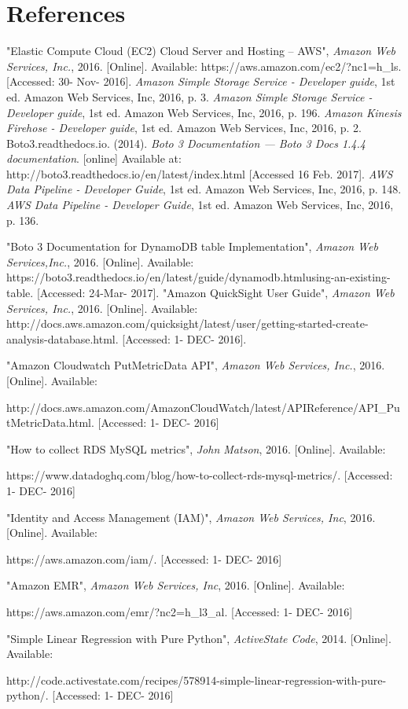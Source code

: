 \section{References}
\begin{thebibliography}{10}
   	"Elastic Compute Cloud (EC2) Cloud Server and Hosting – AWS", \textit{Amazon Web Services, Inc.}, 2016. [Online]. Available: https://aws.amazon.com/ec2/?nc1=h\_ls. [Accessed: 30- Nov- 2016].
    \textit{Amazon Simple Storage Service - Developer guide}, 1st ed. Amazon Web Services, Inc, 2016, p. 3.
  	\textit{Amazon Simple Storage Service - Developer guide}, 1st ed. Amazon Web Services, Inc, 2016, p. 196.
    \textit{Amazon Kinesis Firehose - Developer guide}, 1st ed. Amazon Web Services, Inc, 2016, p. 2.
  	 Boto3.readthedocs.io. (2014). \textit{Boto 3 Documentation — Boto 3 Docs 1.4.4 documentation}. [online] Available at: http://boto3.readthedocs.io/en/latest/index.html [Accessed 16 Feb. 2017].
  	\textit{AWS Data Pipeline - Developer Guide}, 1st ed. Amazon Web Services, Inc, 2016, p. 148.
  	\textit{AWS Data Pipeline - Developer Guide}, 1st ed. Amazon Web Services, Inc, 2016, p. 136.
  
  	"Boto 3 Documentation for DynamoDB table Implementation", \textit{Amazon Web Services,Inc.}, 2016. [Online]. Available: 	   
https://boto3.readthedocs.io/en/latest/guide/dynamodb.htmlusing-an-existing-table. [Accessed: 24-Mar- 2017].
"Amazon QuickSight User Guide", \textit{Amazon Web Services, Inc.}, 2016. [Online]. Available:
 http://docs.aws.amazon.com/quicksight/latest/user/getting-started-create-analysis-database.html. [Accessed: 1- DEC- 2016].
  
	"Amazon Cloudwatch PutMetricData API", \textit{Amazon Web Services, Inc.}, 2016. [Online]. Available:
    
http://docs.aws.amazon.com/AmazonCloudWatch/latest/APIReference/API\_PutMetricData.html. [Accessed: 1- DEC- 2016]

	"How to collect RDS MySQL metrics", \textit{John Matson}, 2016. [Online]. Available:
    
https://www.datadoghq.com/blog/how-to-collect-rds-mysql-metrics/. [Accessed: 1- DEC- 2016]
    
    "Identity and Access Management (IAM)", \textit{Amazon Web Services, Inc}, 2016. [Online]. Available:
    
https://aws.amazon.com/iam/. [Accessed: 1- DEC- 2016]
  
 	"Amazon EMR", \textit{Amazon Web Services, Inc}, 2016. [Online]. Available:
    
https://aws.amazon.com/emr/?nc2=h\_l3\_al. [Accessed: 1- DEC- 2016]

	"Simple Linear Regression with Pure Python", \textit{ActiveState Code}, 2014. [Online]. Available:
    
http://code.activestate.com/recipes/578914-simple-linear-regression-with-pure-python/. [Accessed: 1- DEC- 2016]

\end{thebibliography}